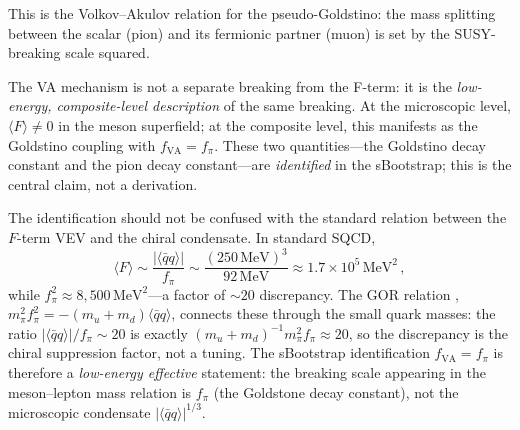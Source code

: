 \documentclass[12pt,a4paper]{article}
\newcommand{\MeV}{\,\text{MeV}}
\newcommand{\fpi}{f_\pi}
\newcommand{\qqbar}{\langle\bar{q}q\rangle}
\begin{document}
This is the Volkov--Akulov relation for the pseudo-Goldstino: the 
mass splitting between the scalar (pion) and its fermionic partner 
(muon) is set by the SUSY-breaking scale squared.

The VA mechanism is not a separate breaking from the F-term: it is 
the \emph{low-energy, composite-level description} of the same 
breaking. At the microscopic level, $\langle F\rangle \neq 0$ 
in the meson superfield; at the composite level, this manifests 
as the Goldstino coupling with $f_{\text{VA}} = f_\pi$. These 
two quantities---the Goldstino decay constant and the pion decay 
constant---are \emph{identified} in the sBootstrap; this is the 
central claim, not a derivation.

The identification should not be confused with the standard relation
between the $F$-term VEV and the chiral condensate. In standard
SQCD,
%
\begin{equation*}
\langle F\rangle \sim \frac{|\qqbar|}{\fpi} \sim
\frac{(250\MeV)^3}{92\MeV} \approx 1.7\times 10^5\MeV^2\,,
\end{equation*}
%
while $\fpi^2 \approx 8{,}500\MeV^2$---a factor of ${\sim}20$
discrepancy. The GOR relation \cite{GOR1968},
$m_\pi^2 \fpi^2 = -(m_u + m_d)\qqbar$, connects these through the
small quark masses: the ratio $|\qqbar|/\fpi \sim 20$ is exactly
$(m_u + m_d)^{-1} m_\pi^2 \fpi \approx 20$, so the discrepancy is
the chiral suppression factor, not a tuning. The sBootstrap
identification $f_{\text{VA}} = f_\pi$ is therefore a
\emph{low-energy effective} statement: the breaking scale appearing
in the meson--lepton mass relation is $f_\pi$ (the Goldstone decay
constant), not the microscopic condensate $|\qqbar|^{1/3}$.
\end{document}
